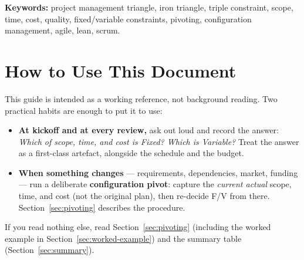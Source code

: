 \documentclass[11pt,a4paper]{article}
\begin{document}
\begin{abstract}
\begin{enumerate}[leftmargin=*]
  \item \textbf{Intentionality as an explicit management decision.} The
  F/V assignment is treated as a first-class, openly negotiated decision
  rather than an emergent property of execution. This is more a framing
  argument than an empirical result, but framing matters: leaving the
  assignment implicit --- as conventional triangle usage does --- is a
  recurring source of unacknowledged trade-offs and stakeholder
  misalignment.
\end{enumerate}

\medskip
\noindent\textbf{Scope and limitations.} This is a practitioner-oriented
synthesis, not a peer-reviewed empirical study. No quantitative validation
is offered. The document is intended as a manager's reference: a
vocabulary and a procedure, not a proof.
\end{abstract}

\medskip
\noindent\textbf{Keywords:} project management triangle, iron triangle,
triple constraint, scope, time, cost, quality, fixed/variable constraints,
pivoting, configuration management, agile, lean, scrum.

\tableofcontents
\bigskip

\section{How to Use This Document}
\label{sec:how-to-use}

This guide is intended as a working reference, not background reading.
Two practical habits are enough to put it to use:

\begin{itemize}[leftmargin=*]
  \item \textbf{At kickoff and at every review,} ask out loud and record
  the answer: \emph{Which of scope, time, and cost is Fixed? Which is
  Variable?} Treat the answer as a first-class artefact, alongside the
  schedule and the budget.
  \item \textbf{When something changes} --- requirements, dependencies,
  market, funding --- run a deliberate \textbf{configuration pivot}:
  capture the \emph{current actual} scope, time, and cost (not the
  original plan), then re-decide F/V from there.
  Section~\ref{sec:pivoting} describes the procedure.
\end{itemize}

If you read nothing else, read Section~\ref{sec:pivoting} (including the
worked example in Section~\ref{sec:worked-example}) and the summary table
(Section~\ref{sec:summary}).
\end{document}

